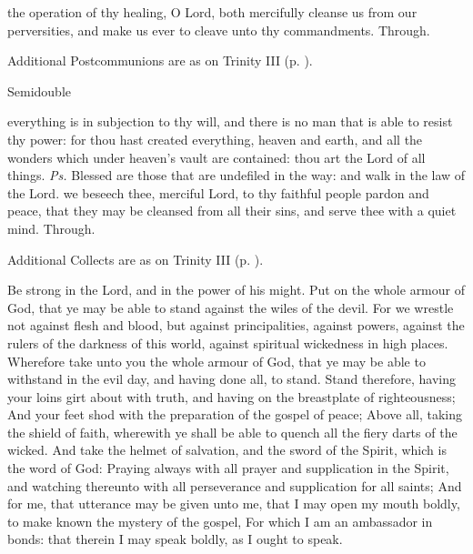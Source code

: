 \postcommunion
{} the operation of thy healing, O Lord, both mercifully cleanse us from our perversities, and make us ever to cleave unto thy commandments. Through.
\begin{rubric}
    Additional Postcommunions are as on Trinity III (p. \pageref{TrinityIII}).
\end{rubric}

\label{trinity}
\begin{inhead}
{Semidouble}
\end{inhead}
\par\noindent
{}


\introit
{} everything is in subjection to thy will, and there is no man that is able to resist thy power: for thou hast created everything, heaven and earth, and all the wonders which under heaven's vault are contained: thou art the Lord of all things. \textit{Ps.} Blessed are those that are undefiled in the way: and walk in the law of the Lord.
\collect
{} we beseech thee, merciful Lord, to thy faithful people pardon and peace, that they may be cleansed from all their sins, and serve thee with a quiet mind. Through.
\begin{rubric}
    Additional Collects are as on Trinity III (p. \pageref{TrinityIII}).
\end{rubric}

 Be strong in the Lord, and in the power of his might. Put on the whole armour of God, that ye may be able to stand against the wiles of the devil. For we wrestle not against flesh and blood, but against principalities, against powers, against the rulers of the darkness of this world, against spiritual wickedness in high places. Wherefore take unto you the whole armour of God, that ye may be able to withstand in the evil day, and having done all, to stand. Stand therefore, having your loins girt about with truth, and having on the breastplate of righteousness; And your feet shod with the preparation of the gospel of peace; Above all, taking the shield of faith, wherewith ye shall be able to quench all the fiery darts of the wicked. And take the helmet of salvation, and the sword of the Spirit, which is the word of God: Praying always with all prayer and supplication in the Spirit, and watching thereunto with all perseverance and supplication for all saints; And for me, that utterance may be given unto me, that I may open my mouth boldly, to make known the mystery of the gospel, For which I am an ambassador in bonds: that therein I may speak boldly, as I ought to speak.

